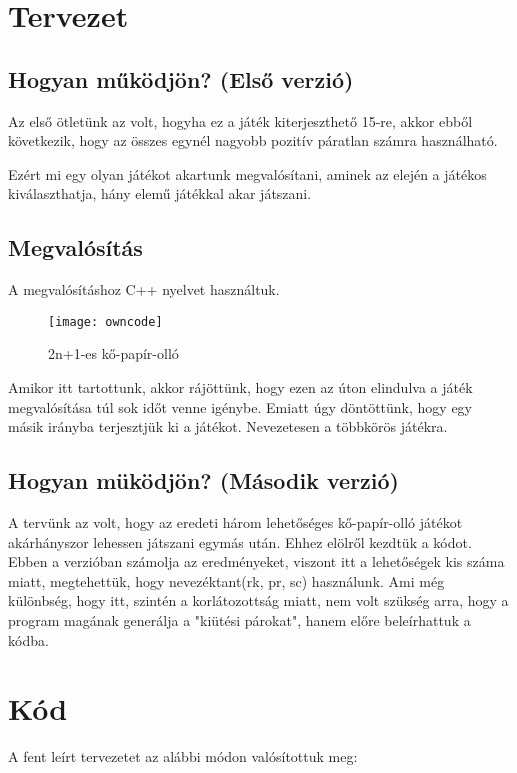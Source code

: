\documentclass[a4paper, 12pt]{article}
\begin{document}
\section{Tervezet}

\subsection{Hogyan működjön? (Első verzió) }\label{Csom}

Az első ötletünk az volt, hogyha ez a játék kiterjeszthető 15-re, akkor ebből következik, hogy az összes egynél nagyobb pozitív páratlan számra használható. 

Ezért mi egy olyan játékot akartunk megvalósítani, aminek az elején a játékos kiválaszthatja, hány elemű játékkal akar játszani.

\newpage
\subsection{Megvalósítás}
A megvalósításhoz C++ nyelvet használtuk.
\begin{figure}[H]
\centering
\texttt{[image: owncode]}
\caption{ 2n+1-es kő-papír-olló}
\label{fig:rps2n1}
\end{figure}

Amikor itt tartottunk, akkor rájöttünk, hogy ezen az úton elindulva a játék megvalósítása túl sok időt venne igénybe. Emiatt úgy döntöttünk, hogy egy másik irányba terjesztjük ki a játékot. Nevezetesen a többkörös játékra.

\subsection{Hogyan müködjön? (Második verzió) }

A tervünk az volt, hogy az eredeti három lehetőséges kő-papír-olló játékot akárhányszor lehessen játszani egymás után. Ehhez elölről kezdtük a kódot. Ebben a verzióban számolja az eredményeket, viszont itt a lehetőségek kis száma miatt, megtehettük, hogy nevezéktant(rk, pr, sc) használunk. Ami még különbség, hogy itt, szintén a korlátozottság miatt, nem volt szükség arra, hogy a program magának generálja a "kiütési párokat", hanem előre beleírhattuk a kódba.

\section{Kód}
A fent leírt tervezetet az alábbi módon valósítottuk meg:
\end{document}
